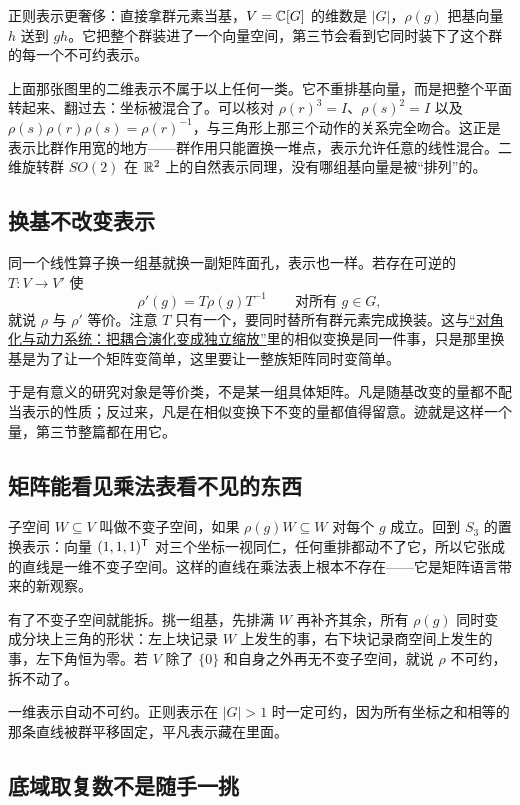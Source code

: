 正则表示更奢侈：直接拿群元素当基，\(V=\mathbb{C}[G]\) 的维数是 \(|G|\)，\(\rho(g)\) 把基向量 \(h\) 送到 \(gh\)。它把整个群装进了一个向量空间，第三节会看到它同时装下了这个群的每一个不可约表示。

上面那张图里的二维表示不属于以上任何一类。它不重排基向量，而是把整个平面转起来、翻过去：坐标被混合了。可以核对 \(\rho(r)^3=I\)、\(\rho(s)^2=I\) 以及 \(\rho(s)\rho(r)\rho(s)=\rho(r)^{-1}\)，与三角形上那三个动作的关系完全吻合。这正是表示比群作用宽的地方——群作用只能置换一堆点，表示允许任意的线性混合。二维旋转群 \(SO(2)\) 在 \(\mathbb{R}^2\) 上的自然表示同理，没有哪组基向量是被``排列''的。

\subsection{换基不改变表示}

同一个线性算子换一组基就换一副矩阵面孔，表示也一样。若存在可逆的 \(T:V\to V'\) 使
\[
\rho'(g)=T\rho(g)T^{-1}
\qquad\text{对所有 }g\in G,
\]
就说 \(\rho\) 与 \(\rho'\) 等价。注意 \(T\) 只有一个，要同时替所有群元素完成换装。这与\hyperref[sec:03-Linear-Algebra/05-Eigenvalues-and-Eigenvectors/02]{``对角化与动力系统：把耦合演化变成独立缩放''}里的相似变换是同一件事，只是那里换基是为了让一个矩阵变简单，这里要让一整族矩阵同时变简单。

于是有意义的研究对象是等价类，不是某一组具体矩阵。凡是随基改变的量都不配当表示的性质；反过来，凡是在相似变换下不变的量都值得留意。迹就是这样一个量，第三节整篇都在用它。

\subsection{矩阵能看见乘法表看不见的东西}

子空间 \(W\subseteq V\) 叫做不变子空间，如果 \(\rho(g)W\subseteq W\) 对每个 \(g\) 成立。回到 \(S_3\) 的置换表示：向量 \((1,1,1)^{\mathsf{T}}\) 对三个坐标一视同仁，任何重排都动不了它，所以它张成的直线是一维不变子空间。这样的直线在乘法表上根本不存在——它是矩阵语言带来的新观察。

有了不变子空间就能拆。挑一组基，先排满 \(W\) 再补齐其余，所有 \(\rho(g)\) 同时变成分块上三角的形状：左上块记录 \(W\) 上发生的事，右下块记录商空间上发生的事，左下角恒为零。若 \(V\) 除了 \(\{0\}\) 和自身之外再无不变子空间，就说 \(\rho\) 不可约，拆不动了。

一维表示自动不可约。正则表示在 \(|G|>1\) 时一定可约，因为所有坐标之和相等的那条直线被群平移固定，平凡表示藏在里面。

\subsection{底域取复数不是随手一挑}

